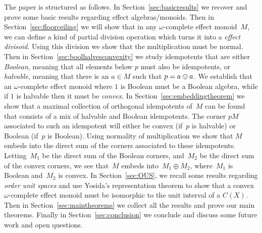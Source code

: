 \documentclass[10pt,conference]{IEEEtran}
\theoremstyle{definition}
\begin{document}
The paper is structured as follows. In Section~\ref{sec:basicresults} we recover and prove some basic results regarding effect algebras/monoids. 
Then in Section~\ref{sec:floorceiling} we will show that in any $\omega$-complete effect monoid~$M$,
we can define a kind of partial division operation which turns it
into a \emph{effect divisoid}. 
Using this division we show that the multiplication must be normal.
Then in Section~\ref{sec:boolhalvesconvexity} we study idempotents that are either \emph{Boolean}, meaning that all elements below
$p$ must also be idempotents, or \emph{halvable}, meaning that there is an $a\in M$
such that $p=a\ovee a$.  
We establish that an $\omega$-complete 
effect monoid where $1$ is Boolean must
be a Boolean algebra, while if $1$ is halvable then it must be \emph{convex}.
In Section~\ref{sec:embeddingtheorem} we show that a maximal collection
of orthogonal idempotents of~$M$ can be found that consists of a mix
of halvable and Boolean idempotents. 
The corner $pM$ associated to such an idempotent
will either be convex (if~$p$ is halvable)
or Boolean (if~$p$ is Boolean).
Using normality of multiplication we show that $M$ embeds
into the direct sum of the corners associated to these idempotents.
Letting~$M_1$ be the direct sum of the Boolean corners,
and~$M_2$ be the direct sum of the convex corners,
we see that~$M$ embeds into~$M_1\oplus M_2$,
where~$M_1$ is Boolean and~$M_2$ is convex.
In Section~\ref{sec:OUS}, we recall some results regarding \emph{order unit spaces}
and use Yosida's representation theorem to show that a convex 
$\omega$-complete effect monoid must be isomorphic to 
the unit interval of a $C(X)$.
Then in Section~\ref{sec:maintheorems} we collect all the results and prove our main theorems. 
Finally in Section~\ref{sec:conclusion} we conclude and discuss some future work and open questions.


\end{document}

